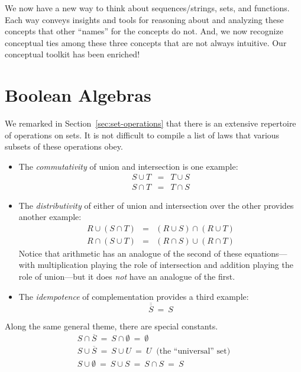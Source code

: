 We now have a new way to think about sequences/strings, sets, and
functions.  Each way conveys insights and tools for reasoning about
and analyzing these concepts that other ``names'' for the concepts do
not.  And, we now recognize conceptual ties among these three concepts
that are not always intuitive.  Our conceptual toolkit has been
enriched!

\section{Boolean Algebras}
\label{sec:Boolean-Algebra}

We remarked in Section~\ref{sec:set-operations} that there is an
extensive repertoire of operations on sets.  It is not difficult to
compile a list of laws that various subsets of these operations obey.
\begin{itemize}
\item
The {\em commutativity} of union and intersection is one example:
\begin{eqnarray*}
S \cup T & = & T \cup S \\
S \cap T & = & T \cap S
\end{eqnarray*}

\item
The {\em distributivity} of either of union and intersection over the
other provides another example:
\begin{eqnarray*}
R \cup (S \cap T) & = & (R \cup S) \cap (R \cup T) \\
R \cap (S \cup T) & = & (R \cap S) \cup (R \cap T)
\end{eqnarray*}
Notice that arithmetic has an analogue of the second of these
equations---with multiplication playing the role of intersection and
addition playing the role of union---but it does {\em not} have an
analogue of the first.

\item
The {\em idempotence} of complementation provides a third example:
\[ \overline{\overline{S}} \ = \ S \]
\end{itemize}
Along the same general theme, there are special constants.
\[
\begin{array}{l}
S \cap \overline{S} \ = \ S \cap \emptyset \ = \ \emptyset \\
S \cup \overline{S} \ = \ S \cup U \ = \ U \ \mbox{ (the ``universal'' set)} \\
S \cup \emptyset \ = \ S \cup S \ = \ S \cap S \ = \ S \\
\end{array}
\]

